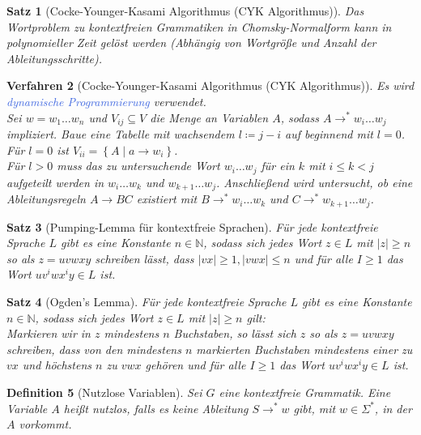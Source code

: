 \documentclass[11pt]{scrartcl}
\newcommand{\tcol}[1]{\textcolor{RoyalBlue}{#1}}
\newcommand{\set}[1]{\left\lbrace #1\right\rbrace}
\theoremstyle{break}
\newtheorem{satz}{Satz}[section]
\newtheorem{defi}[satz]{Definition}
\newtheorem{verf}[satz]{Verfahren}
\begin{document}
    \begin{satz}[Cocke-Younger-Kasami Algorithmus (CYK Algorithmus)]
        Das Wortproblem zu kontextfreien Grammatiken in Chomsky-Normalform kann in polynomieller Zeit gelöst werden (Abhängig von Wortgröße und Anzahl der Ableitungsschritte).
    \end{satz}

    \begin{verf}[Cocke-Younger-Kasami Algorithmus (CYK Algorithmus)]
        Es wird \tcol{dynamische Programmierung} verwendet.\\
        Sei $w=w_1\dots w_n$ und $V_{ij}\subseteq V$ die Menge an Variablen $A$, sodass $A\rightarrow^*w_i\dots w_j$ impliziert.
        Baue eine Tabelle mit wachsendem $l\coloneqq j-i$ auf beginnend mit $l=0$.\\
        Für $l=0$ ist $V_{ii}=\set{A\mid a\rightarrow w_i}$.\\
        Für $l>0$ muss das zu untersuchende Wort $w_i\dots w_j$ für ein $k$ mit $i\leq k<j$ aufgeteilt werden in $w_i\dots w_k$ und $w_{k+1}\dots w_j$.
        Anschließend wird untersucht, ob eine Ableitungsregeln $A\rightarrow BC$ existiert mit $B\rightarrow^* w_i\dots w_k$ und $C\rightarrow^* w_{k+1}\dots w_j$.
    \end{verf}

    \begin{satz}[Pumping-Lemma für kontextfreie Sprachen]
        Für jede kontextfreie Sprache $L$ gibt es eine Konstante $n\in\mathbb{N}$, sodass sich jedes Wort $z\in L$ mit $|z|\geq n$ so als $z=uvwxy$ schreiben lässt, dass $|vx|\geq 1,|vwx|\leq n$ und für alle $I\geq 1$ das Wort $uv^{i}wx^{i}y\in L$ ist.
    \end{satz}

    \begin{satz}[Ogden's Lemma]
        Für jede kontextfreie Sprache $L$ gibt es eine Konstante $n\in\mathbb{N}$, sodass sich jedes Wort $z\in L$ mit $|z|\geq n$ gilt:\\
        Markieren wir in $z$ mindestens $n$ Buchstaben, so lässt sich $z$ so als $z=uvwxy$ schreiben, dass von den mindestens $n$ markierten Buchstaben mindestens einer zu $vx$ und höchstens $n$ zu $vwx$ gehören und für alle $I\geq 1$ das Wort $uv^{i}wx^{i}y\in L$ ist.
    \end{satz}

    \begin{defi}[Nutzlose Variablen]
        Sei $G$ eine kontextfreie Grammatik.
        Eine Variable $A$ heißt nutzlos, falls es keine Ableitung $S\rightarrow^* w$ gibt, mit $w\in\Sigma^*$, in der $A$ vorkommt.
    \end{defi}
\end{document}
